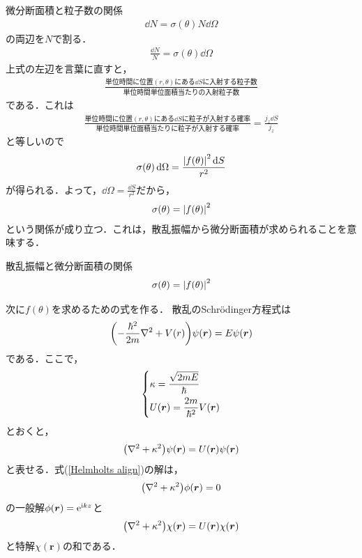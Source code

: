 \documentclass{report}
\begin{document}
  微分断面積と粒子数の関係
  \begin{align}
    \dd{N} = \sigma (\theta) N \dd{\Omega}
  \end{align}
  の両辺を$N$で割る．
  \begin{align}
    \frac{\dd{N}}{N} = \sigma (\theta) \dd{\Omega}
  \end{align}
  上式の左辺を言葉に直すと，
  \begin{align}
    \frac{\text{単位時間に位置$(r,\theta)$にある$\dd{S}$に入射する粒子数}}{\text{単位時間単位面積当たりの入射粒子数}}
  \end{align}
  である．これは
  \begin{align}
    \frac{\text{単位時間に位置$(r,\theta)$にある$\dd{S}$に粒子が入射する確率}}{\text{単位時間単位面積当たりに粒子が入射する確率}} = \frac{j_z \dd{S}}{j_z}
  \end{align}
  と等しいので
  \begin{align}
    \sigma(\theta)\dd{\Omega} = \frac{\abs{f(\theta)}^2\dd{S}}{r^2}
  \end{align}
  が得られる．よって，$\dd{\Omega} = \frac{\dd{S}}{r^2}$だから，
  \begin{align}
    \sigma(\theta) = \abs{f(\theta)}^2
  \end{align}
  という関係が成り立つ．これは，散乱振幅から微分断面積が求められることを意味する．
  \begin{itembox}[l]{散乱振幅と微分断面積の関係}
    \begin{align}
      \sigma(\theta) = \abs{f(\theta)}^2
    \end{align}
  \end{itembox}

  次に$f(\theta)$を求めるための式を作る．
  散乱のSchrödinger方程式は
  \begin{align}
    \qty(-\frac{\hbar^2}{2m}\nabla^2 + V(r))\psi(\bm{r}) = E\psi(\bm{r})
  \end{align}
  である．ここで，
  \begin{align}
    \begin{dcases}
      \kappa = \frac{\sqrt{2mE}}{\hbar}\\
      U(\bm{r}) = \frac{2m}{\hbar^2} V(\bm{r})
    \end{dcases}
  \end{align}
  とおくと，
  \begin{align}
    \label{Helmholtz align}
    \qty(\nabla^2 + \kappa^2)\psi(\bm{r}) = U(\bm{r}) \psi(\bm{r})
  \end{align}
  と表せる．式(\ref{Helmholts align})の解は，
  \begin{align}
    \qty(\nabla^2 + \kappa^2)\phi(\bm{r}) = 0
  \end{align}
  の一般解$\phi(\bm{r}) = \mathrm{e}^{\mathrm{i} k z}$と
  \begin{align}
    \label{Tokkai}
    \qty(\nabla^2 + \kappa^2)\chi(\bm{r}) = U(\bm{r}) \chi(\bm{r})
  \end{align}
  と特解$\chi(\bm{r})$の和である．
  
\end{document}
